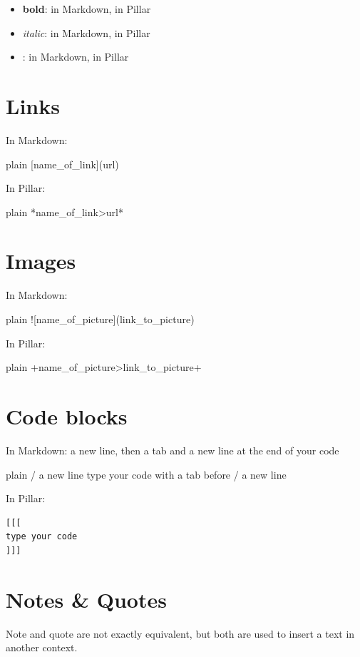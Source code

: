 \documentclass[10pt,twoside,english]{_support/latex/sbabook/sbabook}
\begin{document}
\begin{itemize}
\item \textbf{bold}:  in Markdown,  in Pillar
\item \textit{italic}:  in Markdown,  in Pillar
\item {}:  in Markdown,  in Pillar
\end{itemize}
\section{Links}
In Markdown:

\begin{displaycode}{plain}
[name_of_link](url)
\end{displaycode}

In Pillar:

\begin{displaycode}{plain}
*name_of_link>url*
\end{displaycode}
\section{Images}
In Markdown:

\begin{displaycode}{plain}
![name_of_picture](link_to_picture)
\end{displaycode}

In Pillar:

\begin{displaycode}{plain}
+name_of_picture>link_to_picture+
\end{displaycode}
\section{Code blocks}
In Markdown: a new line, then a tab and a new line at the end of your code

\begin{displaycode}{plain}
/ a new line
    type your code with a tab before
/ a new line
\end{displaycode}

In Pillar:

\begin{verbatim}
[[[
type your code
]]]
\end{verbatim}
\section{Notes \& Quotes}
Note and quote are not exactly equivalent, but both are used to insert a text in another context.
\end{document}
